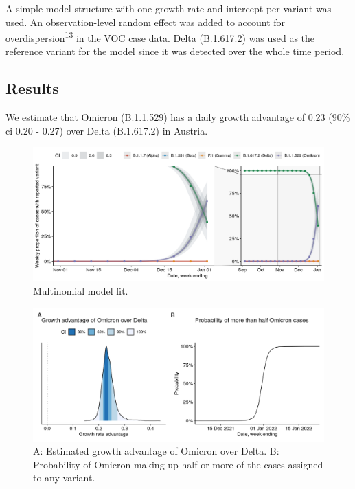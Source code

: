 \documentclass[
]{article}
\begin{document}
A simple model structure with one growth rate and intercept per variant was used. An observation-level random effect was added to account for overdispersion\textsuperscript{13} in the VOC case data. Delta (B.1.617.2) was used as the reference variant for the model since it was detected over the whole time period.

\hypertarget{results-1}{%
\subsection{Results}\label{results-1}}

We estimate that Omicron (B.1.1.529) has a daily growth advantage of 0.23
(90\% ci 0.20 - 0.27) over Delta (B.1.617.2) in Austria.

\begin{figure}

{\centering \includegraphics[width=0.8\linewidth]{omicron_austria_files/figure-latex/multinomial-fit-zoomed-1} 

}

\caption{Multinomial model fit.}\label{fig:multinomial-fit-zoomed}
\end{figure}

\begin{figure}

{\centering \includegraphics[width=0.8\linewidth]{omicron_austria_files/figure-latex/multinomial-growth-posterior-1} 

}

\caption{A: Estimated growth advantage of Omicron over Delta. B: Probability of Omicron making up half or more of the cases assigned to any variant.}\label{fig:multinomial-growth-posterior}
\end{figure}
\end{document}
